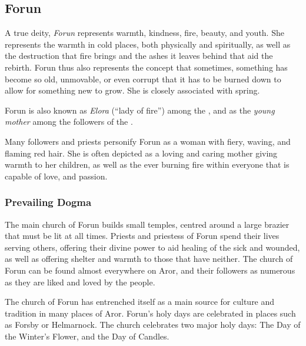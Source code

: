 \clearpage
{}
\clearpage

\subsection{Forun}
\label{sec:Forun}

A true deity, \emph{Forun} represents warmth, kindness, fire, beauty, and
youth. She represents the warmth in cold places, both physically and
spiritually, as well as the destruction that fire brings and the ashes it
leaves behind that aid the rebirth. Forun thus also represents the concept
that sometimes, something has become so old, unmovable, or even corrupt that
it has to be burned down to allow for something new to grow. She is closely
associated with spring.

Forun is also known as \emph{Elora} (``lady of fire'') among the
, and as the \emph{young mother} among the followers of
the .

Many followers and priests personify Forun as a woman with fiery, waving, and
flaming red hair. She is often depicted as a loving and caring mother giving
warmth to her children, as well as the ever burning fire within everyone that
is capable of love, and passion.

\subsubsection{Prevailing Dogma}

The main church of Forun builds small temples, centred around a large brazier
that must be lit at all times. Priests and priestess of Forun spend their
lives serving others, offering their divine power to aid healing of the sick
and wounded, as well as offering shelter and warmth to those that have
neither. The church of Forun can be found almost everywhere on Aror, and their
followers as numerous as they are liked and loved by the people.

The church of Forun has entrenched itself as a main source for culture and
tradition in many places of Aror. Forun's holy days are celebrated in places
such as Forsby or Helmarnock. The church celebrates two major holy days: The
Day of the Winter's Flower, and the Day of Candles.

